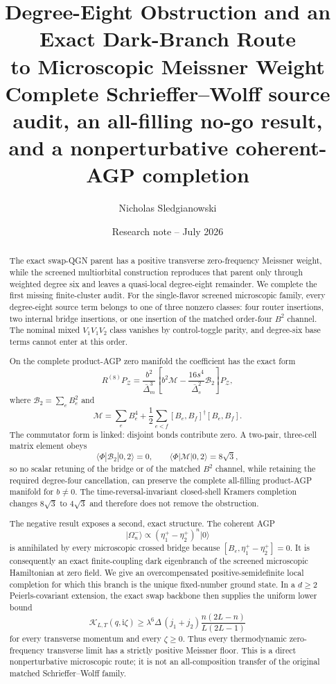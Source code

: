 \documentclass[11pt]{article}
\title{\textbf{Degree-Eight Obstruction and an Exact Dark-Branch Route\\to Microscopic Meissner Weight}\\[0.4em]
\large Complete Schrieffer--Wolff source audit, an all-filling no-go result,\\and a nonperturbative coherent-AGP completion}
\author{Nicholas Sledgianowski}
\date{Research note -- July 2026}
\theoremstyle{definition}
\theoremstyle{remark}
\newcommand{\cZ}{\mathcal Z}
\newcommand{\cM}{\mathcal M}
\newcommand{\cB}{\mathcal B}
\newcommand{\cK}{\mathcal K}
\newcommand{\ket}[1]{\lvert #1\rangle}
\newcommand{\I}{\mathrm i}
\begin{document}
\maketitle

\begin{abstract}
The exact swap-QGN parent has a positive transverse zero-frequency Meissner weight, while the screened multiorbital construction reproduces that parent only through weighted degree six and leaves a quasi-local degree-eight remainder.  We complete the first missing finite-cluster audit.  For the single-flavor screened microscopic family, every degree-eight source term belongs to one of three nonzero classes: four router insertions, two internal bridge insertions, or one insertion of the matched order-four $B^2$ channel.  The nominal mixed $V_1V_1V_2$ class vanishes by control-toggle parity, and degree-six base terms cannot enter at this order.

On the complete product-AGP zero manifold the coefficient has the exact form
\[
 R^{(8)}P_{\cZ}
 =\frac{b^2}{\bar\Delta_m^3}
 \left[b^2\cM-\frac{16s^4}{\bar\Delta_s^2}\cB_2\right]P_{\cZ},
\]
where $\cB_2=\sum_eB_e^2$ and
\[
 \cM=\sum_eB_e^4+\frac12\sum_{e<f}[B_e,B_f]^\dagger[B_e,B_f].
\]
The commutator form is linked: disjoint bonds contribute zero.  A two-pair, three-cell matrix element obeys
\[
 \langle\Phi|\cB_2|0,2\rangle=0,
 \qquad
 \langle\Phi|\cM|0,2\rangle=8\sqrt3,
\]
so no scalar retuning of the bridge or of the matched $B^2$ channel, while retaining the required degree-four cancellation, can preserve the complete all-filling product-AGP manifold for $b\ne0$.  The time-reversal-invariant closed-shell Kramers completion changes $8\sqrt3$ to $4\sqrt3$ and therefore does not remove the obstruction.

The negative result exposes a second, exact structure.  The coherent AGP
\[
 \ket{\Omega^-_n}\propto(\eta_1^+-\eta_2^+)^n\ket0
\]
is annihilated by every microscopic crossed bridge because $[B_e,\eta_1^+-\eta_2^+]=0$.  It is consequently an exact finite-coupling dark eigenbranch of the screened microscopic Hamiltonian at zero field.  We give an overcompensated positive-semidefinite local completion for which this branch is the unique fixed-number ground state.  In a $d\ge2$ Peierls-covariant extension, the exact swap backbone then supplies the uniform lower bound
\[
 \cK_{L,T}(q,\I\zeta)\ge
 \lambda^6\Delta\,(j_1+j_2)\frac{n(2L-n)}{L(2L-1)}
\]
for every transverse momentum and every $\zeta\ge0$.  Thus every thermodynamic zero-frequency transverse limit has a strictly positive Meissner floor.  This is a direct nonperturbative microscopic route; it is not an all-composition transfer of the original matched Schrieffer--Wolff family.
\end{abstract}
\end{document}
